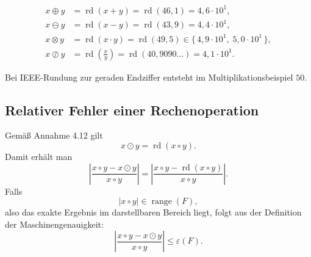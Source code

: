 \documentclass{article}
\begin{document}
\begin{align*}
x\oplus y
&=\operatorname{rd}(x+y)
=\operatorname{rd}(46{,}1)
=4{,}6\cdot 10^1,\\
x\ominus y
&=\operatorname{rd}(x-y)
=\operatorname{rd}(43{,}9)
=4{,}4\cdot 10^1,\\
x\otimes y
&=\operatorname{rd}(x\cdot y)
=\operatorname{rd}(49{,}5)
\in \{\,4{,}9\cdot 10^1,\;5{,}0\cdot 10^1\,\},\\
x\oslash y
&=\operatorname{rd}\!\left(\frac{x}{y}\right)
=\operatorname{rd}(40{,}9090\ldots)
=4{,}1\cdot 10^1.
\end{align*}

Bei IEEE-Rundung zur geraden Endziffer entsteht im Multiplikationsbeispiel \(50\).

\subsection*{Relativer Fehler einer Rechenoperation}

Gemäß Annahme 4.12 gilt
\[
x\odot y=\operatorname{rd}(x\circ y).
\]
Damit erhält man
\[
\left|
\frac{x\circ y-x\odot y}{x\circ y}
\right|
=
\left|
\frac{x\circ y-\operatorname{rd}(x\circ y)}{x\circ y}
\right|.
\]
Falls
\[
|x\circ y|\in\operatorname{range}(F),
\]
also das exakte Ergebnis im darstellbaren Bereich liegt, folgt aus der Definition der Maschinengenauigkeit:
\[
\left|
\frac{x\circ y-x\odot y}{x\circ y}
\right|
\leq \varepsilon(F).
\]
\end{document}
